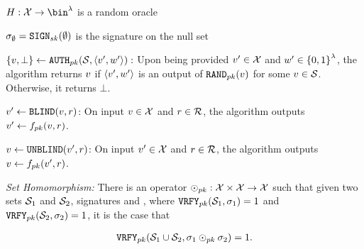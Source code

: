 \begin{definition}
\item $\ro: \sigOutputSpace \rightarrow \bin^{\secParam}$ is a random oracle

\item  $\genericSig[\emptyset] = \signingAlg[\privKey](\emptyset)$ is the signature on the null set
\itemListEnd

		
		\item $\{\genericSigPair[1], \bot\} \assign  \verifyRand[\pubKey](\genericSetVar, \genericSigPairAlt):$ Upon 
being provided $\genericSigPairAlt[1] \in \sigOutputSpace$ and $\genericSigPairAlt[2] \in \setDefn{0,1}^{\secParam}$, the algorithm returns $\genericSigPair[1]$ if $\genericSigPairAlt$ is an output of $\randomize[\pubKey](\genericSigPair[1])$ for some $\genericSigPair[1] \in \genericSetVar$. Otherwise, it returns $\bot$. 
		
		\item $\genericSigPair[1]' \assign \blind(\genericSigPair[1], \genericRand)$: On input $\genericSigPair[1] \in \sigOutputSpace$ and $\genericRand \in \genericRandSpace$, the algorithm outputs $\genericSigPairAlt[1] \gets \randomizeFn[\pubKey](\genericSigPair[1],\genericRand)$.

        \item $\genericSigPair[1]  \assign \unblind(\genericSigPairAlt[1], \genericRand)$: On input $\genericSigPairAlt[1] \in \sigOutputSpace$ and $\genericRand \in \genericRandSpace$, the algorithm outputs $\genericSigPair[1] \assign \randomizeFn[\pubKey](\genericSigPairAlt[1],\genericRand)$.
        
	\itemListEnd
	
	\smallskip
	\textit{Set Homomorphism:} There is an operator
	$\sigHomomorphism[\pubKey]:
	\sigOutputSpace \times \sigOutputSpace
	\rightarrow \sigOutputSpace$ such that given two sets
	$\genericSetVar[1]$ and $\genericSetVar[2]$, signatures
	\genericSig[1] and \genericSig[2], where
	$\verify[\pubKey](\genericSetVar[1], \genericSig[1]) = 1$ and
	$\verify[\pubKey](\genericSetVar[2], \genericSig[2]) = 1$, it
	is the case that
	
	
	\begin{align}
		\label{eq:sig_homomorphism_union}
		\verify[\pubKey](\genericSetVar[1] \cup \genericSetVar[2],
		\genericSig[1] \sigHomomorphism[\pubKey] \genericSig[2]) = 1.
	\end{align}
	

\end{definition}
